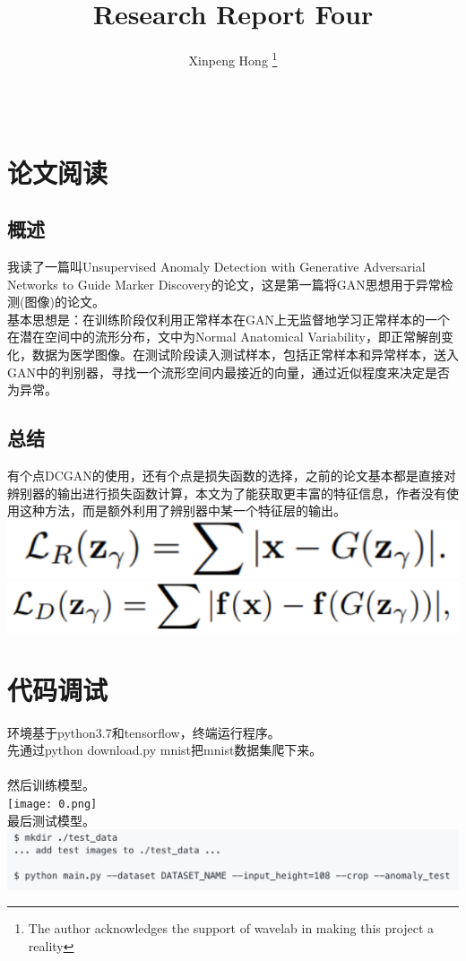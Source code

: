 \documentclass[11pt,a4paper]{ctexart}
\title{Research Report Four}
\author{Xinpeng Hong
	\thanks{The author acknowledges the support of wavelab in
		making this project a reality}\\
	\\\\
}
\begin{document}
\makecover
\maketitle
	

\section{论文阅读}
\subsection{概述}
\noindent 我读了一篇叫Unsupervised Anomaly Detection with Generative Adversarial Networks to Guide Marker Discovery的论文，这是第一篇将GAN思想用于异常检测(图像)的论文。\\
基本思想是：在训练阶段仅利用正常样本在GAN上无监督地学习正常样本的一个在潜在空间中的流形分布，文中为Normal Anatomical Variability，即正常解剖变化，数据为医学图像。在测试阶段读入测试样本，包括正常样本和异常样本，送入GAN中的判别器，寻找一个流形空间内最接近的向量，通过近似程度来决定是否为异常。
\subsection{总结}
\noindent 有个点DCGAN的使用，还有个点是损失函数的选择，之前的论文基本都是直接对辨别器的输出进行损失函数计算，本文为了能获取更丰富的特征信息，作者没有使用这种方法，而是额外利用了辨别器中某一个特征层的输出。\\
\includegraphics[scale=1]{1.png}\\
\includegraphics[scale=1]{2.png}\\
\section{代码调试}
\noindent 环境基于python3.7和tensorflow，终端运行程序。\\
\noindent 先通过python download.py mnist把mnist数据集爬下来。\\\\
\noindent 然后训练模型。\\
\texttt{[image: 0.png]}\\
\noindent 最后测试模型。\\
\includegraphics[scale=0.7]{4.png}\\
	
\end{document}

